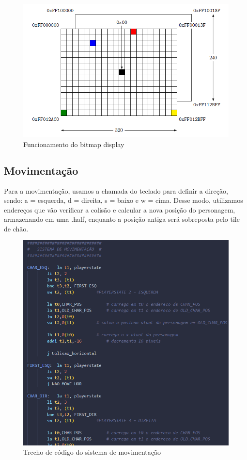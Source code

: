 \documentclass[a4paper]{sbgames}
\begin{document}
\begin{figure}[H]
  \centering
  \includegraphics[width=1.0\linewidth]{./Figures/bitmapdisplay.png}
  \caption{Funcionamento do bitmap display}
  \label{fig:01}
\end{figure}

\subsection{Movimentação}{
\label{sec:mov}

Para a movimentação, usamos a chamada do
teclado para definir a direção, sendo: a = esquerda, d = direita, s = baixo e w = cima. Desse modo, utilizamos endereços  que vão verificar a colisão e calcular a nova
posição do personagem, armazenando em
uma .half, enquanto a posição antiga será sobreposta pelo tile de chão.
}

\begin{figure}[H]
  \centering
  \includegraphics[width=1.0\linewidth]{./Figures/movimentacao.png}
  \caption{Trecho de código do sistema de movimentação}
  \label{fig:01}
\end{figure}
\end{document}
